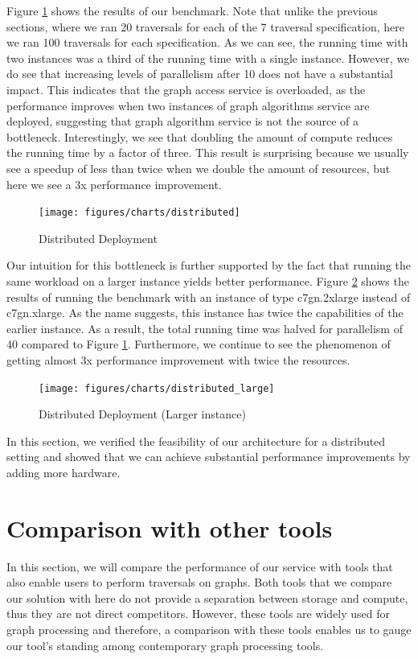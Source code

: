 \smallskip
Figure \ref{fig:distributed} shows the results of our benchmark. Note that
unlike the previous sections, where we ran 20 traversals for each of the 7
traversal specification, here we ran 100 traversals for each specification.
As we can see, the running time with two instances was a third of the running
time with a single instance. However, we do see that increasing levels of
parallelism after 10 does not have a substantial impact. This indicates that
the graph access service is overloaded, as the performance improves when two
instances of graph algorithms service are deployed, suggesting that graph
algorithm service is not the source of a bottleneck. Interestingly, we see that doubling the
amount of compute reduces the running time by a factor of three. This result is surprising
because we usually see a speedup of less than twice when we double the amount of
resources, but here we see a 3x performance improvement.
\begin{figure}[ht]
    \centering
    \texttt{[image: figures/charts/distributed]}
    \caption{Distributed Deployment}
    \label{fig:distributed}
\end{figure}


\medskip
Our intuition for this bottleneck is further supported by the fact that running
the same workload on a larger instance yields better performance.
Figure \ref{fig:distributedLarge} shows the results of running the benchmark
with an instance of type c7gn.2xlarge instead of c7gn.xlarge. As the name
suggests, this instance has twice the capabilities of the earlier instance.
As a result, the total running time was halved for parallelism
of 40 compared to Figure \ref{fig:distributed}. Furthermore, we continue to see
the phenomenon of getting almost 3x performance improvement with twice the
resources.
\begin{figure}[ht]
    \centering
    \texttt{[image: figures/charts/distributed\_large]}
    \caption{Distributed Deployment (Larger instance)}
    \label{fig:distributedLarge}
\end{figure}

\smallskip
In this section, we verified the feasibility of our architecture for a
distributed setting and showed that we can achieve substantial performance
improvements by adding more hardware.

\section{Comparison with other tools}\label{sec:cmpOtherTools}
In this section, we will compare the performance of our service with tools that
also enable users to perform traversals on graphs. Both tools that we compare
our solution with here do not provide a separation between storage and
compute, thus they are not direct competitors. However, these tools are widely
used for graph processing and therefore, a comparison with these tools enables
us to gauge our tool's standing among contemporary graph processing tools.

